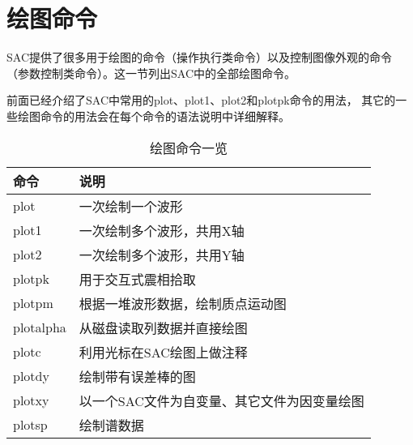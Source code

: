 \section{绘图命令}
SAC提供了很多用于绘图的命令（操作执行类命令）以及控制图像外观的命令
（参数控制类命令）。这一节列出SAC中的全部绘图命令。

前面已经介绍了SAC中常用的plot、plot1、plot2和plotpk命令的用法，
其它的一些绘图命令的用法会在每个命令的语法说明中详细解释。

\begin{table}[!htb]
\centering
\ttfamily
\caption{绘图命令一览}
\label{table:plot-commands}
\begin{tabular}{ll}
\toprule
命令    &       说明            \\
\midrule
plot    &    一次绘制一个波形   \\
plot1   &    一次绘制多个波形，共用X轴  \\
plot2   &   一次绘制多个波形，共用Y轴   \\
plotpk  &   用于交互式震相拾取  \\
plotpm  &   根据一堆波形数据，绘制质点运动图    \\
plotalpha & 从磁盘读取列数据并直接绘图  \\
plotc &     利用光标在SAC绘图上做注释   \\
plotdy  &   绘制带有误差棒的图  \\
plotxy  &   以一个SAC文件为自变量、其它文件为因变量绘图 \\
plotsp  &   绘制谱数据  \\
\bottomrule
\end{tabular}
\end{table}
